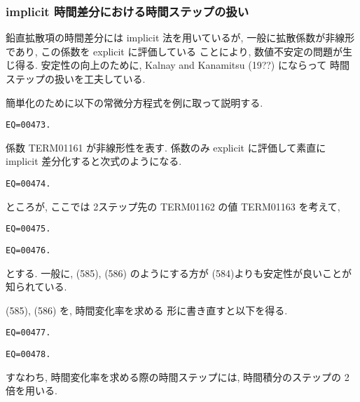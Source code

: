 \subsubsection{implicit 時間差分における時間ステップの扱い}

鉛直拡散項の時間差分には implicit 法を用いているが, 
一般に拡散係数が非線形であり, この係数を explicit に評価している
ことにより, 数値不安定の問題が生じ得る. 
安定性の向上のために, Kalnay and Kanamitsu (19??) にならって
時間ステップの扱いを工夫している. 

簡単化のために以下の常微分方程式を例に取って説明する. 
\begin{verbatim}
EQ=00473.
\end{verbatim}
係数 TERM01161 が非線形性を表す. 
係数のみ explicit に評価して素直に implicit 差分化すると次式のようになる. 
\begin{verbatim}
EQ=00474.
\end{verbatim}
ところが, ここでは 2ステップ先の TERM01162 の値 TERM01163 を考えて, 
\begin{verbatim}
EQ=00475.
\end{verbatim}
\begin{verbatim}
EQ=00476.
\end{verbatim}
とする. 
一般に, (585), (586) のようにする方が
(584)よりも安定性が良いことが知られている. 

(585), (586) を, 時間変化率を求める
形に書き直すと以下を得る. 
\begin{verbatim}
EQ=00477.
\end{verbatim}
\begin{verbatim}
EQ=00478.
\end{verbatim}
すなわち, 時間変化率を求める際の時間ステップには, 
時間積分のステップの 2 倍を用いる. 


